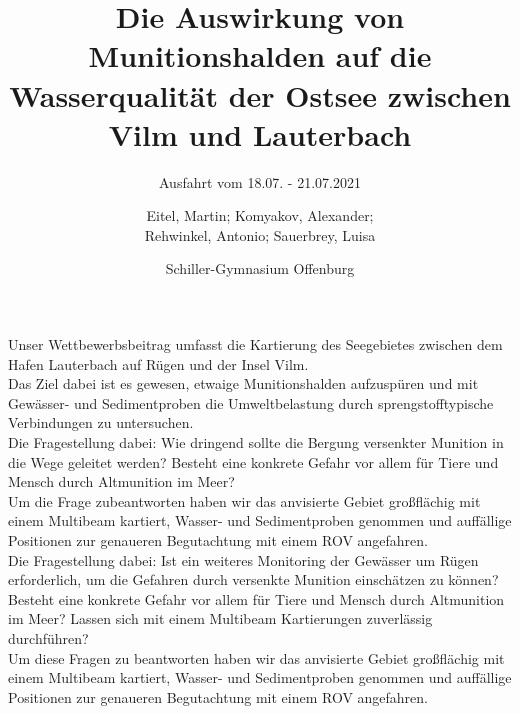 \documentclass[12pt,titlepage]{scrreprt}
\begin{document}
% 
\begin{titlepage}

	

\title{Die Auswirkung von Munitionshalden auf die Wasserqualität der Ostsee zwischen Vilm und Lauterbach}
\subtitle{Ausfahrt vom 18.07. - 21.07.2021}
\titlehead{\centering\texttt{[image: Bilder/DSC05220]}}


\author{Eitel, Martin; Komyakov, Alexander; \\ Rehwinkel, Antonio; Sauerbrey, Luisa\\ \and Schiller-Gymnasium Offenburg}

\publishers{Wissenschaftspate: Prof Dr. Jens Greinert \texttt{jgreinert@geomar.de} \\
\vspace*{2ex} Betreuer: Marek Czernohous \texttt{m.czernohous@schiller-offenburg.de}}

\maketitle

\end{titlepage}
Unser Wettbewerbsbeitrag umfasst die Kartierung des Seegebietes zwischen dem Hafen Lauterbach
auf Rügen und der Insel Vilm. \\ Das Ziel dabei ist es gewesen, etwaige Munitionshalden aufzuspüren 
und mit Gewässer- und Sedimentproben die Umweltbelastung durch sprengstofftypische Verbindungen zu untersuchen.
\\ Die Fragestellung dabei: Wie dringend sollte die Bergung versenkter Munition in die Wege geleitet werden?
Besteht eine konkrete Gefahr vor allem für Tiere und Mensch durch Altmunition im Meer? \\ Um die Frage zubeantworten haben wir das anvisierte Gebiet großflächig mit einem Multibeam kartiert, Wasser- und Sedimentproben genommen und auffällige Positionen zur genaueren Begutachtung mit einem ROV angefahren.\\



Die Fragestellung dabei: Ist ein weiteres Monitoring der Gewässer um Rügen erforderlich, um die Gefahren durch versenkte Munition einschätzen zu können? Besteht eine konkrete Gefahr vor allem für Tiere und Mensch durch Altmunition im Meer? Lassen sich mit einem Multibeam Kartierungen zuverlässig durchführen?\\ Um diese Fragen zu beantworten haben wir das anvisierte Gebiet großflächig mit einem Multibeam kartiert, Wasser- und Sedimentproben genommen und auffällige Positionen zur genaueren Begutachtung mit einem ROV angefahren.\\
\end{document}
